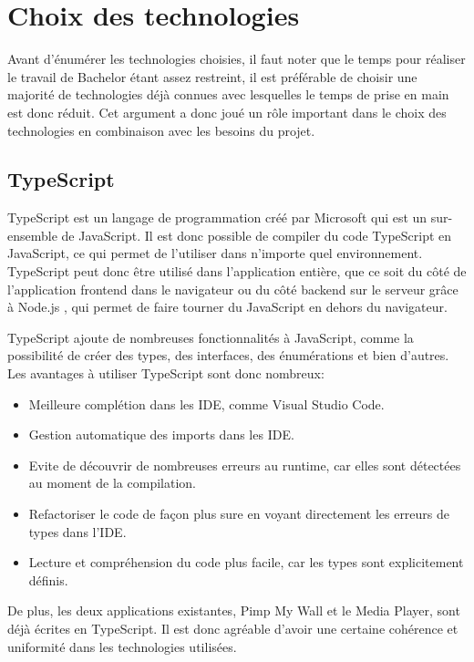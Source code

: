 \section{Choix des technologies}

Avant d'énumérer les technologies choisies, il faut noter que le temps pour réaliser le travail de Bachelor étant assez restreint, il est préférable de choisir une majorité de technologies déjà connues avec lesquelles le temps de prise en main est donc réduit. Cet argument a donc joué un rôle important dans le choix des technologies en combinaison avec les besoins du projet.

\subsection{TypeScript}

TypeScript \cite{typescript} est un langage de programmation créé par Microsoft qui est un sur-ensemble de JavaScript. Il est donc possible de compiler du code TypeScript en JavaScript, ce qui permet de l'utiliser dans n'importe quel environnement. TypeScript peut donc être utilisé dans l'application entière, que ce soit du côté de l'application frontend dans le navigateur ou du côté backend sur le serveur grâce à Node.js \cite{nodejs}, qui permet de faire tourner du JavaScript en dehors du navigateur.

TypeScript ajoute de nombreuses fonctionnalités à JavaScript, comme la possibilité de créer des types, des interfaces, des énumérations et bien d'autres. Les avantages à utiliser TypeScript sont donc nombreux:

\begin{itemize}
  \item Meilleure complétion dans les IDE, comme Visual Studio Code.
  \item Gestion automatique des imports dans les IDE.
  \item Evite de découvrir de nombreuses erreurs au runtime, car elles sont détectées au moment de la compilation.
  \item Refactoriser le code de façon plus sure en voyant directement les erreurs de types dans l'IDE.
  \item Lecture et compréhension du code plus facile, car les types sont explicitement définis.
\end{itemize}

De plus, les deux applications existantes, Pimp My Wall et le Media Player, sont déjà écrites en TypeScript. Il est donc agréable d'avoir une certaine cohérence et uniformité dans les technologies utilisées.

